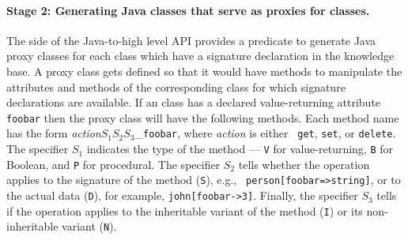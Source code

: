 \paragraph{Stage 2: Generating Java classes that serve as proxies for \FLSYSTEM classes.}
The \FLSYSTEM side of the Java-to-\FLSYSTEM high level API provides a predicate
to generate Java proxy classes for each \fl class which have a signature
declaration in the \FLSYSTEM knowledge base. A proxy class gets defined so
that it would have methods to manipulate the attributes and methods of the
corresponding \fl class for which signature declarations are available.  If
an \fl class has a declared value-returning attribute {\tt foobar} then the
proxy class will have the following methods. Each method name has the form
\emph{action}$S_1S_2S_3$\_{\tt foobar}, where \emph{action} is either {\tt
  get}, {\tt set}, or {\tt delete}. The specifier $S_1$ indicates the type
of the method --- {\tt V} for value-returning, {\tt B} for Boolean, and
{\tt P} for procedural. The specifier $S_2$ tells whether the operation
applies to the signature of the method ({\tt S}), e.g., {\tt
  person[foobar=>string]}, or to the actual data ({\tt D}), for example,
{\tt john[foobar->3]}.  Finally, the specifier $S_3$ tells if the operation
applies to the inheritable variant of the method ({\tt I})
or its non-inheritable variant ({\tt N}).
